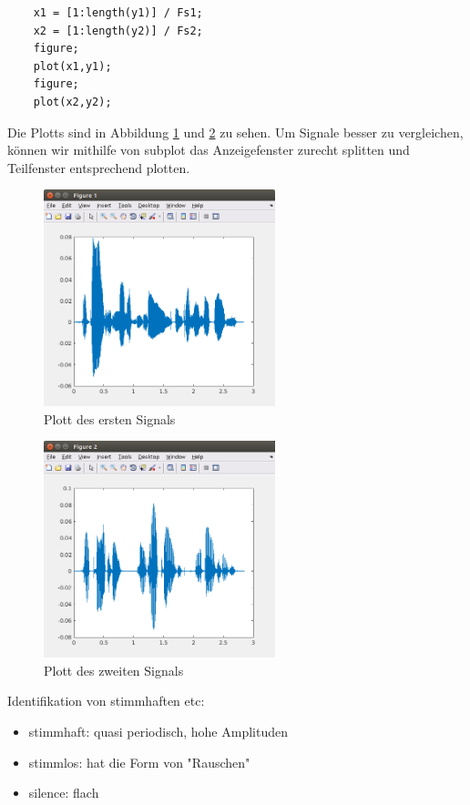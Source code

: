 \begin{lstlisting}
	x1 = [1:length(y1)] / Fs1;
	x2 = [1:length(y2)] / Fs2;
	figure; 
	plot(x1,y1);
	figure;
	plot(x2,y2);
\end{lstlisting}

Die Plotts sind in Abbildung \ref{img:signal1} und \ref{img:signal2} zu sehen.
Um Signale besser zu vergleichen, können wir mithilfe von subplot das Anzeigefenster zurecht splitten und Teilfenster entsprechend plotten.

\begin{figure}[H]
	\centering
	\includegraphics[width=0.6\textwidth]{./bilder/signal1.png}
	\caption{Plott des ersten Signals}
	\label{img:signal1}
\end{figure}

\begin{figure}[H]
	\centering
	\includegraphics[width=0.6\textwidth]{./bilder/signal2.png}
	\caption{Plott des zweiten Signals}
	\label{img:signal2}
\end{figure}


Identifikation von stimmhaften etc:
\begin{itemize}
\item stimmhaft: quasi periodisch, hohe Amplituden
\item stimmlos: hat die Form von "Rauschen" 
\item silence: flach
\end{itemize}

